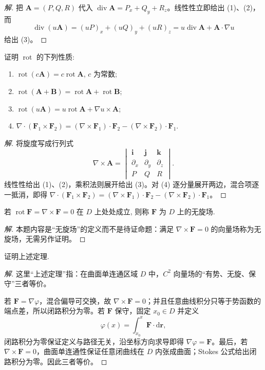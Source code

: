 \documentclass[../../数学分析培优讲义(答案版).tex]{subfiles}
\begin{document}
\begin{proof}[解]
把 $\bm A=(P,Q,R)$ 代入 $\operatorname{div}\bm A=P_x+Q_y+R_z$。线性性立即给出 (1)、(2)，而
\[
\operatorname{div}(u\bm A)=(uP)_x+(uQ)_y+(uR)_z
=u\operatorname{div}\bm A+\bm A\cdot\nabla u
\]
给出 (3)。
\end{proof}

\begin{example}
证明 $\operatorname{rot}$ 的下列性质:
\begin{enumerate}[label=(\arabic*)]
    \item $\operatorname{rot}(c\bm A)=c\operatorname{rot}\bm A$, $c$ 为常数;
    \item $\operatorname{rot}(\bm A+\bm B)=\operatorname{rot}\bm A+\operatorname{rot}\bm B$;
    \item $\operatorname{rot}(u\bm A)=u\operatorname{rot}\bm A+\nabla u\times\bm A$;
    \item $\nabla\cdot(\bm F_1\times\bm F_2)=(\nabla\times\bm F_1)\cdot\bm F_2-(\nabla\times\bm F_2)\cdot\bm F_1$.
\end{enumerate}
\end{example}

\begin{proof}[解]
将旋度写成行列式
\[
\nabla\times\bm A=
\begin{vmatrix}\bm i&\bm j&\bm k\\
\partial_x&\partial_y&\partial_z\\P&Q&R\end{vmatrix}.
\]
线性性给出 (1)、(2)，乘积法则展开给出 (3)。对 (4) 逐分量展开两边，混合项逐一抵消，即得
$\nabla\cdot(\bm F_1\times\bm F_2)=(\nabla\times\bm F_1)\cdot\bm F_2-(\nabla\times\bm F_2)\cdot\bm F_1$。
\end{proof}

\begin{example}
若 $\operatorname{rot}\bm F=\nabla\times\bm F=0$ 在 $D$ 上处处成立, 则称 $\bm F$ 为 $D$ 上的无旋场.
\end{example}

\begin{proof}[解]
本题内容是“无旋场”的定义而不是待证命题：满足 $\nabla\times\bm F=0$ 的向量场称为无旋场，无需另作证明。
\end{proof}

\begin{example}
证明上述定理.
\end{example}

\begin{proof}[解]
这里“上述定理”指：在曲面单连通区域 $D$ 中，$C^2$ 向量场的“有势、无旋、保守”三者等价。

若 $\bm F=\nabla\varphi$，混合偏导可交换，故 $\nabla\times\bm F=0$；并且任意曲线积分只等于势函数的端点差，所以闭路积分为零。若 $\bm F$ 保守，固定 $x_0\in D$ 并定义
\[
\varphi(x)=\int_{x_0}^{x}\bm F\cdot\mathrm{d}\bm r,
\]
闭路积分为零保证定义与路径无关，沿坐标方向求导即得 $\nabla\varphi=\bm F$。最后，若 $\nabla\times\bm F=0$，曲面单连通性保证任意闭曲线在 $D$ 内张成曲面；Stokes 公式给出闭路积分为零。因此三者等价。
\end{proof}
\end{document}
